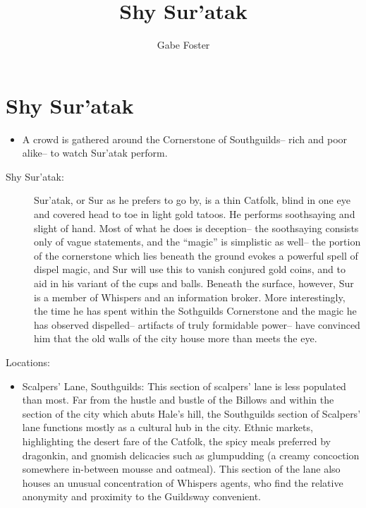\documentclass[11pt]{article}
\theoremstyle{definition}
\theoremstyle{remark}
\begin{document}
	\title{Shy Sur'atak}
	\date{\vspace{-24pt}}
	\author{Gabe Foster}
	\maketitle

\section{Shy Sur'atak}

\begin{description}

\item[Hooks:] 

\begin{itemize}

\item{A crowd is gathered around the Cornerstone of Southguilds-- rich and poor alike-- to watch Sur'atak perform.}

\end{itemize}

\item[NPCs:]
\begin{description}

\item[Shy Sur'atak:]  Sur'atak, or Sur as he prefers to go by, is a thin Catfolk, blind in one eye and covered head to toe in light gold tatoos. He performs soothsaying and slight of hand. Most of what he does is deception-- the soothsaying consists only of vague statements, and the ``magic'' is simplistic as well-- the portion of the cornerstone which lies beneath the ground evokes a powerful spell of dispel magic, and Sur will use this to vanish conjured gold coins, and to aid in his variant of the cups and balls.  Beneath the surface, however, Sur is a member of Whispers and an information broker. More interestingly, the time he has spent within the Sothguilds Cornerstone and the magic he has observed dispelled-- artifacts of truly formidable power-- have convinced him that the old walls of the city house more than meets the eye.

\end{description}

\item{Locations:}

\begin{itemize}

\item{Scalpers' Lane, Southguilds:} This section of scalpers' lane is less populated than most.  Far from the hustle and bustle of the Billows and within the section of the city which abuts Hale's hill, the Southguilds section of Scalpers' lane functions mostly as a cultural hub in the city.  Ethnic markets, highlighting the desert fare of the Catfolk, the spicy meals preferred by dragonkin, and gnomish delicacies such as glumpudding (a creamy concoction somewhere in-between mousse and oatmeal). This section of the lane also houses an unusual concentration of Whispers agents, who find the relative anonymity and proximity to the Guildsway convenient.

\end{itemize}

\end{description}
\end{document}

